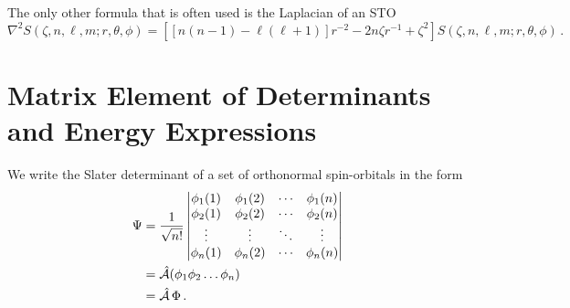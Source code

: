 \documentclass{article}
\theoremstyle{plain}\theoremheaderfont{\normalfont\itshape}\theorembodyfont{\rmfamily}\theoremseparator{.}\newtheorem*{rem}{Remark}\newtheorem*{ex}{Example}\newtheorem*{proof}{Proof}\newtheorem*{altp}{Alternative proof}
\theoremstyle{plain}\theoremheaderfont{\normalfont\bfseries}\theorembodyfont{\rmfamily}\theoremseparator{.}\newtheorem{thm}{Theorem}[section]\newtheorem{lem}[thm]{Lemma}\newtheorem{prop}[thm]{Proposition}\newtheorem*{cor}{Corollary}\newtheorem{defn}[thm]{Definition}\newtheorem{clm}[thm]{Claim}\newtheorem{clminproof}{Claim}
\theoremstyle{break}\theoremheaderfont{\normalfont\itshape}\theorembodyfont{\rmfamily}\theoremseparator{.\medskip}\newtheorem*{proofskip}{Proof}\newtheorem*{exs}{Examples}\newtheorem*{rems}{Remarks}
\theoremstyle{break}\theoremheaderfont{\normalfont\bfseries}\theorembodyfont{\rmfamily}\theoremseparator{.\medskip}\newtheorem{lemskip}[thm]{Lemma}\newtheorem{defnskip}[thm]{Definition}\newtheorem{propskip}[thm]{Proposition}\newtheorem{thmskip}[thm]{Theorem}
\numberwithin{equation}{section}
\newcommand{\laplacian}{\nabla^2}
\DeclareMathOperator{\antisymm}{\hat{\mathcal{A}}}
\begin{document}
    The only other formula that is often used is the Laplacian of an STO
    \begin{equation}
        \laplacian S(\zeta,n,\ell,m;r,\theta,\phi)=[[n(n-1)-\ell(\ell+1)]r^{-2}-2n\zeta r^{-1}+\zeta^2]S(\zeta,n,\ell,m;r,\theta,\phi)\,.
    \end{equation}

    \newpage
    \section{Matrix Element of Determinants and Energy Expressions}
    We write the Slater determinant of a set of orthonormal spin-orbitals in the form
    \begin{align}
        \Psi&=\frac{1}{\sqrt{n!}}\begin{vmatrix}
            \phi_1(1) & \phi_1(2) & \cdots & \phi_1(n)\\
            \phi_2(1) & \phi_2(2) & \cdots & \phi_2(n)\\
            \vdots & \vdots & \ddots & \vdots \\
            \phi_n(1) & \phi_n(2) & \cdots & \phi_n(n)
        \end{vmatrix}\notag\\
        &=\antisymm(\phi_1\phi_2\dots\phi_n)\notag\\
        &=\antisymm\Phi\,.
    \end{align}
\end{document}

